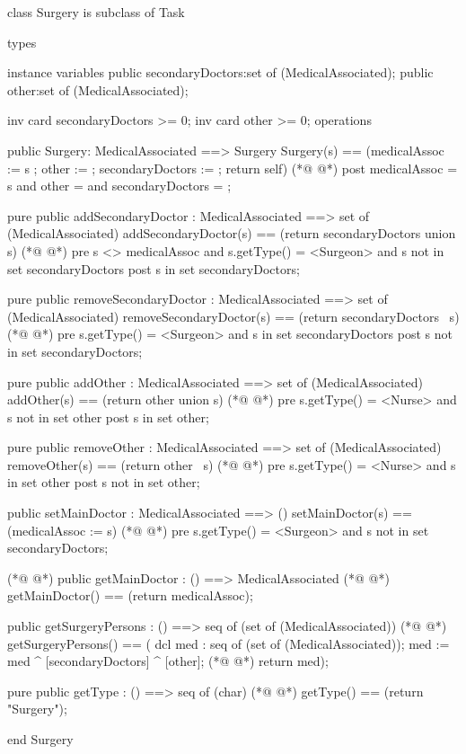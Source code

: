 \begin{vdmpp}[breaklines=true]
class Surgery is subclass of Task

types

instance variables
  public secondaryDoctors:set of (MedicalAssociated);
  public other:set of (MedicalAssociated);
  
  inv card secondaryDoctors >= 0;
  inv card other >= 0;
operations

 public Surgery: MedicalAssociated ==> Surgery
  Surgery(s) == (medicalAssoc := s ; other := {}; secondaryDoctors := {}; return self)
(*@
\label{Surgery:15}
@*)
 post medicalAssoc = s and other = {} and secondaryDoctors = {};
 
 pure public addSecondaryDoctor : MedicalAssociated ==> set of (MedicalAssociated)
  addSecondaryDoctor(s) == (return secondaryDoctors union {s})
(*@
\label{addSecondaryDoctor:19}
@*)
 pre s <> medicalAssoc and s.getType() = <Surgeon> and  s not in set secondaryDoctors
 post s in set secondaryDoctors;
  
 pure public removeSecondaryDoctor : MedicalAssociated ==> set of (MedicalAssociated)
  removeSecondaryDoctor(s) == (return secondaryDoctors \ {s})
(*@
\label{removeSecondaryDoctor:24}
@*)
 pre s.getType() = <Surgeon> and s in set secondaryDoctors
 post s not in set secondaryDoctors;
  
 pure public addOther : MedicalAssociated ==> set of (MedicalAssociated)
  addOther(s) == (return other union {s})
(*@
\label{addOther:29}
@*)
 pre s.getType() = <Nurse> and s not in set other
 post s in set other;
  
 pure public removeOther : MedicalAssociated ==> set of (MedicalAssociated)
  removeOther(s) == (return other \ {s})
(*@
\label{removeOther:34}
@*)
 pre s.getType() = <Nurse> and s in set other
 post s not in set other;
  
 public setMainDoctor : MedicalAssociated ==> ()
  setMainDoctor(s) == (medicalAssoc := s)
(*@
\label{setMainDoctor:39}
@*)
 pre s.getType() = <Surgeon> and s not in set secondaryDoctors;
 
(*@
\label{getSurgeryPersons:41}
@*)
 public getMainDoctor : () ==> MedicalAssociated
(*@
\label{getMainDoctor:42}
@*)
  getMainDoctor() == (return medicalAssoc);
  
 public getSurgeryPersons : () ==> seq of (set of (MedicalAssociated))
(*@
\label{getSecondaryDoctors:45}
@*)
  getSurgeryPersons() == (
               dcl med : seq of (set of (MedicalAssociated));
               med := med ^ [secondaryDoctors] ^ [other];
(*@
\label{getOthers:48}
@*)
               return med);
  
 pure public getType : () ==> seq of (char) 
(*@
\label{getType:51}
@*)
  getType() == (return "Surgery");

end Surgery
\end{vdmpp}
